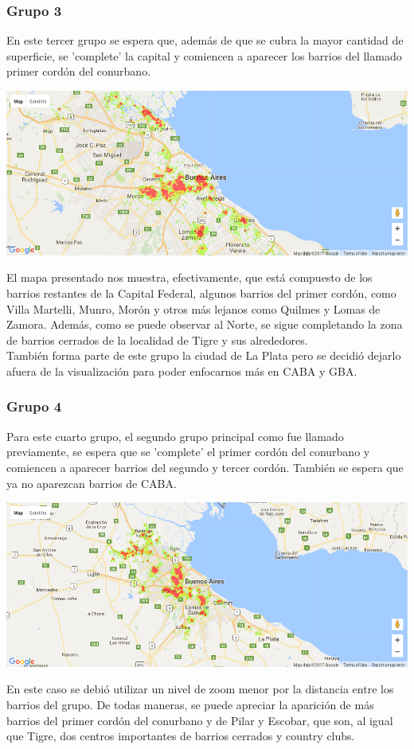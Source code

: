 \documentclass[a4paper, 10pt]{article}
\newcommand\tab[1][0.5cm]{\hspace*{#1}}
\begin{document}
				\subsubsection{Grupo 3}
					En este tercer grupo se espera que, además de que se cubra la mayor cantidad de superficie, se 'complete' la
					capital y comiencen a aparecer los barrios del llamado primer cordón del conurbano.
					\begin{center}
						\includegraphics[width=\textwidth]{images/m2Group3HeatMap}
				  	\end{center}
				  	\tab El mapa presentado nos muestra, efectivamente, que está compuesto de los barrios restantes de la Capital
				  	Federal, algunos barrios del primer cordón, como Villa Martelli, Munro, Morón y otros más lejanos como Quilmes y
				  	Lomas de Zamora. Además, como se puede observar al Norte, se sigue completando la zona de barrios cerrados de la
				  	localidad de Tigre y sus alrededores. \\
				  	\tab También forma parte de este grupo la ciudad de La Plata pero se decidió dejarlo afuera de la visualización
				  	para poder enfocarnos más en CABA y GBA.
				\subsubsection{Grupo 4}
					Para este cuarto grupo, el segundo grupo principal como fue llamado previamente, se espera que se 'complete' el
					primer cordón del conurbano y comiencen a aparecer barrios del segundo y tercer cordón. También se espera que ya
					no aparezcan barrios de CABA.
					\begin{center}
						\includegraphics[width=\textwidth]{images/m2Group4HeatMap}
				  	\end{center}
				  	\tab En este caso se debió utilizar un nivel de zoom menor por la distancia entre los barrios del grupo. De todas
				  	maneras, se puede apreciar la aparición de más barrios del primer cordón del conurbano y de Pilar y Escobar, que
				  	son, al igual que Tigre, dos centros importantes de barrios cerrados y country clubs.
\end{document}

